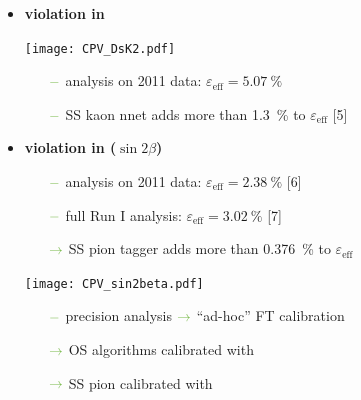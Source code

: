 {\begin{minipage}{0.474\boxwidth}
\begin{itemize}
\item\textbf{\CP violation in \BsToDsK}

\vspace{-2.1em}
\begin{flushleft}
\texttt{[image: CPV\_DsK2.pdf]}
\end{flushleft}
\vspace{-2.8em}

	\begin{itemize}
	\setlength\itemsep{0.01em}
	\setlength{\itemindent}{-.11in}
	\item[${\color{tu_gruen}-}$] analysis on \num{2011} data: $\varepsilon_\text{eff}=\SI{5.07}{\%}$
	\item[${\color{tu_gruen}-}$] SS kaon nnet adds more than \SI{1.3}{\%} to $\varepsilon_\text{eff}$ [5]
	\end{itemize}
\end{itemize}
\end{minipage}
\vspace{0.7em}
\hfill
\begin{minipage}{0.474\boxwidth}
\vspace{-0.2em}
\begin{itemize}
\item\textbf{\CP violation in \BdToJPsiKS ($\sin2\beta$)}
	\begin{itemize}
	\setlength\itemsep{0.01em}
	\setlength{\itemindent}{-.11in}
	\item[${\color{tu_gruen}-}$] analysis on \num{2011} data: $\varepsilon_\text{eff}=\SI{2.38}{\%}$ [6]
	\item[${\color{tu_gruen}-}$] full Run I analysis: $\varepsilon_\text{eff}=\SI{3.02}{\%}$ [7] 
	\setlength{\itemindent}{.05in} 
	\item[${\color{tu_gruen}\rightarrow}$] SS pion tagger adds more than \SI{0.376}{\%} to $\varepsilon_\text{eff}$ 
	\end{itemize}
	
\vspace{-1.7em}
\begin{center}
\texttt{[image: CPV\_sin2beta.pdf]}
\end{center}
\vspace{-2.5em}

	\begin{itemize}
	\setlength{\itemindent}{-.11in}
	\setlength\itemsep{0.01em}
	\item[${\color{tu_gruen}-}$] precision analysis \hspace{0.1em}${\color{tu_gruen}\rightarrow}$ ``ad-hoc'' FT calibration
	\setlength{\itemindent}{.05in}
	\item[${\color{tu_gruen}\rightarrow}$] OS algorithms calibrated with \BuToJPsiKp 
	\item[${\color{tu_gruen}\rightarrow}$] SS pion calibrated with \BdToJPsiKst
	\end{itemize}


\end{itemize}
\end{minipage}}
